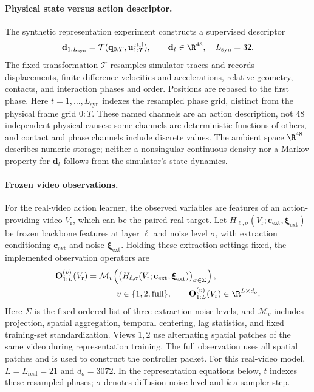 \paragraph{Physical state versus action descriptor.}
The synthetic representation experiment constructs a supervised descriptor
\begin{equation}
  \mathbf d_{1:L_{\mathrm{syn}}}=\mathcal T(\mathbf q_{0:T},\mathbf u^{\mathrm{ctrl}}_{1:T}),
  \qquad \mathbf d_t\in\R^{48},\quad L_{\mathrm{syn}}=32.
  \label{eq:impl-synthetic-descriptor}
\end{equation}
The fixed transformation $\mathcal T$ resamples simulator traces and records
displacements, finite-difference velocities and accelerations, relative
geometry, contacts, and interaction phases and order. Positions are rebased
to the first phase. Here $t=1,\ldots,L_{\mathrm{syn}}$ indexes the resampled
phase grid, distinct from the physical frame grid $0:T$.
These named channels are an action description, not 48 independent physical
causes: some channels are deterministic functions of others, and contact and
phase channels include discrete values. The ambient space $\R^{48}$ describes
numeric storage; neither a nonsingular continuous density nor a Markov
property for $\mathbf d_t$ follows from the simulator's state dynamics.

\paragraph{Frozen video observations.}
For the real-video action learner, the observed variables are features of
an action-providing video $V_{\mathrm r}$, which can be the paired real target.
Let $H_{\ell,\sigma}(V_{\mathrm r};\mathbf c_{\mathrm{ext}},\boldsymbol\xi_{\mathrm{ext}})$ be frozen backbone
features at layer $\ell$ and noise level $\sigma$, with extraction conditioning
$\mathbf c_{\mathrm{ext}}$ and noise $\boldsymbol\xi_{\mathrm{ext}}$. Holding these extraction
settings fixed, the implemented observation operators are
\begin{equation}
 \begin{aligned}
  \mathbf O^{(v)}_{1:L}(V_{\mathrm r})
   &=\mathcal M_v\!\left(
       \bigl(H_{\ell,\sigma}(V_{\mathrm r};\mathbf c_{\mathrm{ext}},\boldsymbol\xi_{\mathrm{ext}})\bigr)_{\sigma\in\Sigma}
     \right),\\
  &\hspace{12mm}v\in\{1,2,\mathrm{full}\},\qquad
       \mathbf O^{(v)}_{1:L}(V_{\mathrm r})\in\R^{L\times d_o}.
 \end{aligned}
 \label{eq:impl-feature-observation}
\end{equation}
Here $\Sigma$ is the fixed ordered list of three extraction noise levels,
and $\mathcal M_v$ includes projection, spatial aggregation, temporal
centering, lag statistics, and fixed training-set standardization.
Views $1,2$ use alternating spatial patches of the same video during
representation training. The full observation uses all spatial patches
and is used to construct the controller packet.
For this real-video model, $L=L_{\mathrm{real}}=21$ and $d_o=3072$.
In the representation equations below, $t$ indexes these resampled phases;
$\sigma$ denotes diffusion noise level and $k$ a sampler step.


